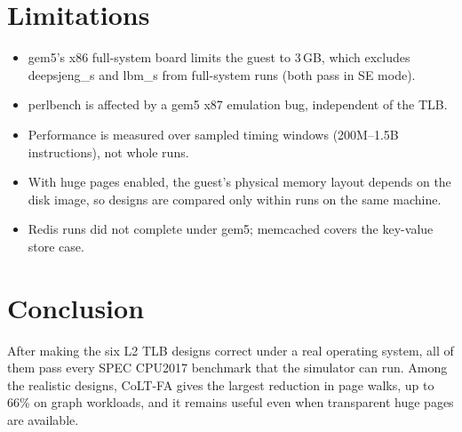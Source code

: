 \documentclass[11pt]{article}
\begin{document}
\section{Limitations}
\begin{itemize}
  \item gem5's x86 full-system board limits the guest to 3\,GB, which excludes deepsjeng\_s and lbm\_s from full-system runs (both pass in SE mode).
  \item perlbench is affected by a gem5 x87 emulation bug, independent of the TLB.
  \item Performance is measured over sampled timing windows (200M--1.5B instructions), not whole runs.
  \item With huge pages enabled, the guest's physical memory layout depends on the disk image, so designs are compared only within runs on the same machine.
  \item Redis runs did not complete under gem5; memcached covers the key-value store case.
\end{itemize}

\section{Conclusion}
After making the six L2 TLB designs correct under a real operating system, all of them pass every SPEC CPU2017 benchmark that the simulator can run. Among the realistic designs, CoLT-FA gives the largest reduction in page walks, up to 66\% on graph workloads, and it remains useful even when transparent huge pages are available.
\end{document}
